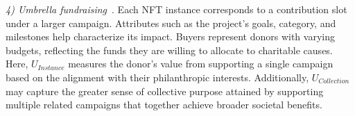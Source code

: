 \documentclass[conference]{IEEEtran}
\newcommand{\1}[1]{\mathds{1}\left[#1\right]}
\theoremstyle{plain}
\newcommand{\eg}{e.g.}
\newcommand{\method}{\textsf{BANTER}\xspace}
\begin{document}
{    %
     
    \textit{4) Umbrella fundraising}~\cite{eckel2020independent, li2016social}. Each NFT instance corresponds to a contribution slot under a larger campaign. Attributes such as the project’s goals, category, and milestones help characterize its impact. Buyers represent donors with varying budgets, reflecting the funds they are willing to allocate to charitable causes. 
    Here, $U_{\textit{Instance}}$ measures the donor’s value from supporting a single campaign based on the alignment with their philanthropic interests. Additionally, $U_{\textit{Collection}}$ may capture the greater sense of collective purpose attained by supporting multiple related campaigns that together achieve broader societal benefits.



}
\end{document}
